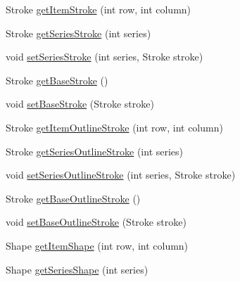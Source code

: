 \begin{DoxyCompactItemize}
\item 
Stroke \mbox{\hyperlink{interfaceorg_1_1jfree_1_1chart_1_1renderer_1_1xy_1_1_x_y_item_renderer_aa66c723ca571214d9c2f0a55380b374c}{get\+Item\+Stroke}} (int row, int column)
\item 
Stroke \mbox{\hyperlink{interfaceorg_1_1jfree_1_1chart_1_1renderer_1_1xy_1_1_x_y_item_renderer_a424b6a0660bc162300ba763f2c6656ea}{get\+Series\+Stroke}} (int series)
\item 
void \mbox{\hyperlink{interfaceorg_1_1jfree_1_1chart_1_1renderer_1_1xy_1_1_x_y_item_renderer_a177adecc8b87f936d6efcdd31bae876b}{set\+Series\+Stroke}} (int series, Stroke stroke)
\item 
Stroke \mbox{\hyperlink{interfaceorg_1_1jfree_1_1chart_1_1renderer_1_1xy_1_1_x_y_item_renderer_a79fb7d064aca7241db250c916c1739d5}{get\+Base\+Stroke}} ()
\item 
void \mbox{\hyperlink{interfaceorg_1_1jfree_1_1chart_1_1renderer_1_1xy_1_1_x_y_item_renderer_ab49f6dd93d5b994aea58be71e1f8c9b9}{set\+Base\+Stroke}} (Stroke stroke)
\item 
Stroke \mbox{\hyperlink{interfaceorg_1_1jfree_1_1chart_1_1renderer_1_1xy_1_1_x_y_item_renderer_af61ea1a1e6555440da7c3937085ad845}{get\+Item\+Outline\+Stroke}} (int row, int column)
\item 
Stroke \mbox{\hyperlink{interfaceorg_1_1jfree_1_1chart_1_1renderer_1_1xy_1_1_x_y_item_renderer_a59b1beb337bddb75e4d43e5f26295244}{get\+Series\+Outline\+Stroke}} (int series)
\item 
void \mbox{\hyperlink{interfaceorg_1_1jfree_1_1chart_1_1renderer_1_1xy_1_1_x_y_item_renderer_ad8ab9700d6c753b47123392601e21dd8}{set\+Series\+Outline\+Stroke}} (int series, Stroke stroke)
\item 
Stroke \mbox{\hyperlink{interfaceorg_1_1jfree_1_1chart_1_1renderer_1_1xy_1_1_x_y_item_renderer_a089616d66c786c07af6a7f2f12b696f2}{get\+Base\+Outline\+Stroke}} ()
\item 
void \mbox{\hyperlink{interfaceorg_1_1jfree_1_1chart_1_1renderer_1_1xy_1_1_x_y_item_renderer_aab77837ee355fecff3b20d5559727bf3}{set\+Base\+Outline\+Stroke}} (Stroke stroke)
\item 
Shape \mbox{\hyperlink{interfaceorg_1_1jfree_1_1chart_1_1renderer_1_1xy_1_1_x_y_item_renderer_a15d5e2b9251050a857a0f1fb57f32863}{get\+Item\+Shape}} (int row, int column)
\item 
Shape \mbox{\hyperlink{interfaceorg_1_1jfree_1_1chart_1_1renderer_1_1xy_1_1_x_y_item_renderer_ac84c5f4c56b840b3c53cf69cf6504994}{get\+Series\+Shape}} (int series)

\end{DoxyCompactItemize}
